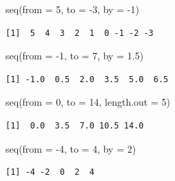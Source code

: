 \documentclass[
  letterpaper,
  DIV=11,
  numbers=noendperiod]{scrreprt}
\newenvironment{Shaded}{\begin{snugshade}}{\end{snugshade}}
\newcommand{\AttributeTok}[1]{\textcolor[rgb]{0.40,0.45,0.13}{#1}}
\newcommand{\DecValTok}[1]{\textcolor[rgb]{0.68,0.00,0.00}{#1}}
\newcommand{\FloatTok}[1]{\textcolor[rgb]{0.68,0.00,0.00}{#1}}
\newcommand{\FunctionTok}[1]{\textcolor[rgb]{0.28,0.35,0.67}{#1}}
\newcommand{\NormalTok}[1]{\textcolor[rgb]{0.00,0.23,0.31}{#1}}
\newcommand{\SpecialCharTok}[1]{\textcolor[rgb]{0.37,0.37,0.37}{#1}}
\begin{document}
\begin{tcolorbox}[enhanced jigsaw, colbacktitle=quarto-callout-tip-color!10!white, opacitybacktitle=0.6, breakable, left=2mm, leftrule=.75mm, toprule=.15mm, toptitle=1mm, bottomtitle=1mm, colframe=quarto-callout-tip-color-frame, opacityback=0, coltitle=black, arc=.35mm, titlerule=0mm, colback=white, bottomrule=.15mm, title=\textcolor{quarto-callout-tip-color}{\faLightbulb}\hspace{0.5em}{Answer}, rightrule=.15mm]

\begin{Shaded}
\begin{Highlighting}[]
\FunctionTok{seq}\NormalTok{(}\AttributeTok{from =} \DecValTok{5}\NormalTok{, }\AttributeTok{to =} \SpecialCharTok{{-}}\DecValTok{3}\NormalTok{, }\AttributeTok{by =} \SpecialCharTok{{-}}\DecValTok{1}\NormalTok{)}
\end{Highlighting}
\end{Shaded}

\begin{verbatim}
[1]  5  4  3  2  1  0 -1 -2 -3
\end{verbatim}

\begin{Shaded}
\begin{Highlighting}[]
\FunctionTok{seq}\NormalTok{(}\AttributeTok{from =} \SpecialCharTok{{-}}\DecValTok{1}\NormalTok{, }\AttributeTok{to =} \DecValTok{7}\NormalTok{, }\AttributeTok{by =} \FloatTok{1.5}\NormalTok{)}
\end{Highlighting}
\end{Shaded}

\begin{verbatim}
[1] -1.0  0.5  2.0  3.5  5.0  6.5
\end{verbatim}

\begin{Shaded}
\begin{Highlighting}[]
\FunctionTok{seq}\NormalTok{(}\AttributeTok{from =} \DecValTok{0}\NormalTok{, }\AttributeTok{to =} \DecValTok{14}\NormalTok{, }\AttributeTok{length.out =} \DecValTok{5}\NormalTok{)}
\end{Highlighting}
\end{Shaded}

\begin{verbatim}
[1]  0.0  3.5  7.0 10.5 14.0
\end{verbatim}

\begin{Shaded}
\begin{Highlighting}[]
\FunctionTok{seq}\NormalTok{(}\AttributeTok{from =} \SpecialCharTok{{-}}\DecValTok{4}\NormalTok{, }\AttributeTok{to =} \DecValTok{4}\NormalTok{, }\AttributeTok{by =} \DecValTok{2}\NormalTok{)}
\end{Highlighting}
\end{Shaded}

\begin{verbatim}
[1] -4 -2  0  2  4
\end{verbatim}

\end{tcolorbox}
\end{document}
